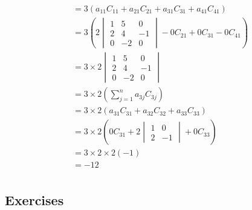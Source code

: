 \documentclass[12pt letter]{report}
\begin{document}
{{\begin{align*}
             & = 3 \left(
      a_{11} C_{11} + a_{21} C_{21} + a_{31} C_{31} + a_{41} C_{41}
      \right)                                                                                                             \\
             & = 3 \left( 2 \begin{vmatrix} 1 & 5 & 0 \\ 2 & 4 & -1 \\ 0 & -2 & 0 \end{vmatrix} - 0 C_{21} + 0 C_{31} - 0
      C_{41}\right)                                                                                                       \\
             & = 3 \times 2 \begin{vmatrix} 1 & 5 & 0 \\ 2 & 4 & -1 \\ 0 & -2 & 0 \end{vmatrix}                           \\
             & = 3 \times 2 \left(
      \displaystyle\sum_{j=1}^{n} a_{3j} C_{3j}
      \right)                                                                                                             \\
             & = 3 \times 2 \left( a_{31} C_{31} + a_{32} C_{32} + a_{33} C_{33} \right)                                  \\
             & = 3 \times 2 \left( 0 C_{31} + 2 \begin{vmatrix} 1 & 0 \\ 2 & -1 \end{vmatrix} + 0 C_{33}  \right)         \\
             & = 3 \times 2 \times 2 \left( -1 \right)                                                                    \\
             & = -12                                                                                                      \\
    \end{align*}
  }
}


\subsection{Exercises}

\end{document}
